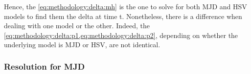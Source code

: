 \documentclass[12pt]{report}
\begin{document}
Hence, the \cref{eq:methodology:delta:mh} is the one to solve for both MJD and HSV models to find them the delta at time t.
Nonetheless, there is a difference when dealing with one model or the other. 
Indeed, the \cref{eq:methodology:delta:p1,eq:methodology:delta:p2}, depending on whether the underlying model is MJD or HSV, are not identical.

\subsubsection*{Resolution for MJD}

































\end{document}
